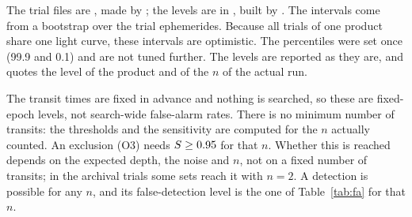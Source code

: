 The trial files are , made by ; the levels are in
, built by . The intervals come from a
bootstrap over the trial ephemerides. Because all trials of one product share one light curve, these intervals are
optimistic. The percentiles were set once (99.9 and 0.1) and are not tuned further. The levels are reported as they are,
and  quotes the level of the product and of the $n$ of the actual run.

The transit times are fixed in advance and nothing is searched, so these are fixed-epoch levels, not search-wide
false-alarm rates. There is no minimum number of transits: the thresholds and the sensitivity are computed for the $n$
actually counted. An exclusion (O3) needs $S \geq 0.95$ for that $n$. Whether this is reached depends on the
expected depth, the noise and $n$, not on a fixed number of transits; in the archival trials some sets reach it with
$n = 2$. A detection is possible for any $n$, and its false-detection level is the one of Table~\ref{tab:fa} for that
$n$.
